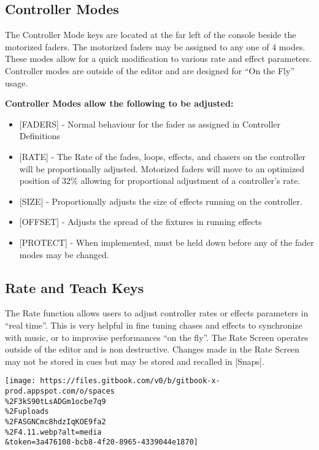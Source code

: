 \documentclass[
]{article}
\begin{document}
\hypertarget{controller-modes}{%
\subsection{Controller Modes}\label{controller-modes}}

The Controller Mode keys are located at the far left of the console beside the motorized faders. The motorized faders may be assigned to any one of 4 modes. These modes allow for a quick modification to various rate and effect parameters. Controller modes are outside of the editor and are designed for ``On the Fly'' usage.

\textbf{Controller Modes allow the following to be adjusted:}

\begin{itemize}
\item
  {[}FADERS{]} - Normal behaviour for the fader as assigned in Controller Definitions
\item
  {[}RATE{]} - The Rate of the fades, loops, effects, and chasers on the controller will be proportionally adjusted. Motorized faders will move to an optimized position of 32\% allowing for proportional adjustment of a controller's rate.
\item
  {[}SIZE{]} - Proportionally adjusts the size of effects running on the controller.
\item
  {[}OFFSET{]} - Adjusts the spread of the fixtures in running effects
\item
  {{[}PROTECT{]} - When implemented, must be held down before any of the fader modes may be changed.}
\end{itemize}

\hypertarget{rate-and-teach-keys}{%
\subsection{Rate and Teach Keys}\label{rate-and-teach-keys}}

The Rate function allows users to adjust controller rates or effects parameters in ``real time''. This is very helpful in fine tuning chases and effects to synchronize with music, or to improvise performances ``on the fly''. The Rate Screen operates outside of the editor and is non destructive. Changes made in the Rate Screen may not be stored in cues but may be stored and recalled in {[}Snaps{]}.

\texttt{[image: https://files.gitbook.com/v0/b/gitbook-x-prod.appspot.com/o/spaces\\\%2F3kS90tLsADGm1ocbe7q9\\\%2Fuploads\\\%2FASGNCmc8hdzIqKOE9fa2\\\%2F4.11.webp?alt=media\\\&token=3a476108-bcb8-4f20-8965-4339044e1870]}
\end{document}
